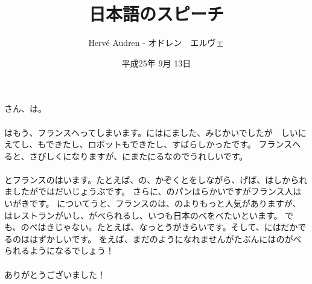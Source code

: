 \documentclass[a4paper,12pt]{article}
\begin{document}
\begin{CJK}{UTF8}{min}

\author{Herv\'e Audren - オドレン　エルヴェ}
\title{日本語のスピーチ}
\date{平成25年 9月 13日}
\maketitle
\paragraph*{}さん、は。
\paragraph*{}はもう、フランスへってしまいます。にはにました、みじかいでしたが　しいにえてし、もできたし、ロボットもできたし、すばらしかったです。
フランスへると、さびしくになりますが、にまたにるなのでうれしいです。

\paragraph*{}とフランスのはいます。たとえば、の、かぞくとをしながら、げば、はしかられましたがではだいじょうぶです。
さらに、のパンはらかいですがフランス人はいがきです。
についてうと、フランスのは、のよりもっと人気がありますが、はレストランがいし、がべられるし、いつも日本のべをべたいといます。
でも、のべはきじゃない。たとえば、なっとうがきらいです。そして、にはだかでるのははずかしいです。
をえば、まだのようになれませんがたぶんにはのがべられるようになるでしょう！

\paragraph*{}ありがとうございました！

\end{CJK}
\end{document}
